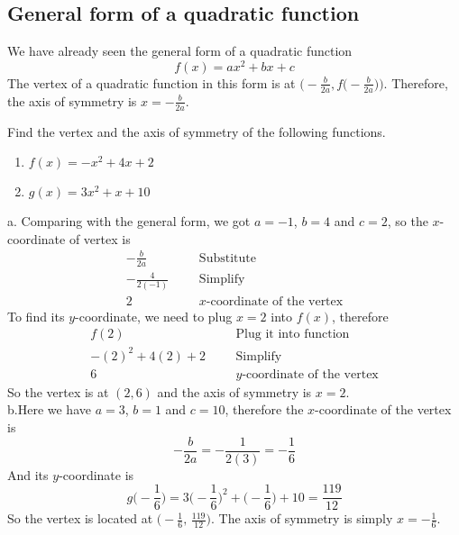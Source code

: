 \subsection{General form of a quadratic function}
We have already seen the general form of a quadratic function
\begin{equation}
            f(x) = ax^2+bx+c
            \label{gen_qdrt}
\end{equation}
The vertex of a quadratic function in this form is at $\biggl(-\frac{b}{2a}, f\bigr(-\frac{b}{2a}\bigl)\biggr)$. Therefore, the axis of symmetry is $x=-\frac{b}{2a}$.
\begin{exa}
    Find the vertex and the axis of symmetry of the following functions.
        \begin{enumerate}[\bfseries a.]
        \item $f(x)= -x^2+4x+2$
        \item $g(x)= 3x^2+x+10$
    \end{enumerate}
\end{exa}
%
a. Comparing with the general form, we got $a=-1$, $b=4$ and $c=2$, so the $x$-coordinate of vertex is 
\begin{align*}
    -\frac{b}{2a}&      &       &\text{Substitute}\\
    -\frac{4}{2(-1)}&   &       &\text{Simplify}\\
    2&      &           &\text{$x$-coordinate of the vertex}
\end{align*}
To find its $y$-coordinate, we need to plug $x=2$ into $f(x)$, therefore
\begin{align*}
    f(2)&     &   &\text{Plug it into function}\\
    -(2)^2+4(2)+2&  &   &\text{Simplify}\\
    6&      &       &\text{$y$-coordinate of the vertex}
\end{align*}
So the vertex is at $(2,6)$ and the axis of symmetry is $x=2$. \\[0.5cm]
%
b.Here we have $a=3$, $b=1$ and $c=10$, therefore the $x$-coordinate of the vertex is 
\[
            -\frac{b}{2a} =-\frac{1}{2(3)}=-\frac{1}{6}
            \]
And its $y$-coordinate is 
\[
            g\biggl(-\frac{1}{6}\biggr) = 3\biggl(-\frac{1}{6}\biggr)^2+\biggl(-\frac{1}{6}\biggr)+10 = \frac{119}{12}
\]
So the vertex is located at $\displaystyle \biggl(-\frac{1}{6},\, \frac{119}{12}\biggr)$. The axis of symmetry is simply $\displaystyle x=-\frac{1}{6}$.
